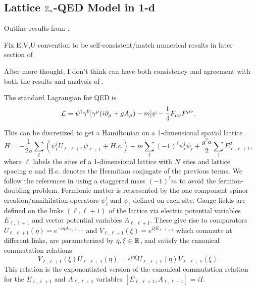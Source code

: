 \documentclass[10pt,reqno]{amsart}
\numberwithin{equation}{section}
\begin{document}
	\subsection{Lattice $\mathbb{Z}_n$-QED Model in 1-d}
	
	Outline results from \cite{Ercolessi18,Notarnicola15,Wiese13}.
	
	Fix E,V,U convention to be self-consistent/match numerical results in later section of \cite{Ercolessi18}
	
	After more thought, I don't think can have both consistency and agreement with both the results and analysis of \cite{Ercolessi18}.
	
	The standard Lagrangian for QED is 
	\begin{equation}
		\mathcal{L} = \psi^\dagger\gamma^0[\gamma^\mu(i\partial_\mu+gA_\mu)-m]\psi -\frac{1}{4}F_{\mu\nu}F^{\mu\nu}.
	\end{equation}
	
	This can be discretized to get a Hamiltonian on a 1-dimensional spatial lattice \cite{Ercolessi18,Notarnicola15,Wiese13}.
	\begin{equation}\label{eq:1dQEDLatticeHamiltonian}
		H=-\frac{1}{2a} \sum_\ell (\psi_\ell^\dagger U_{\ell,\ell+1}\psi_{\ell+1}+H.c.) + m\sum_\ell (-1)^\ell \psi_\ell^\dagger\psi_\ell+ \frac{g^2 a}{2} \sum_{\ell} E_{\ell,\ell+1}^2,		
	\end{equation}
	where $\ell$ labels the sites of a 1-dimensional lattice with $N$ sites and lattice spacing $a$ and H.c. denotes the Hermitian conjugate of the previous terms. 
	We follow the references in using a staggered mass $(-1)^\ell m$ to avoid the fermion-doubling problem.
	Fermionic matter is represented by the one component spinor creation/annihilation operators $\psi_\ell^\dagger$ and $\psi_\ell$ defined on each site.
	Gauge fields are defined on the links $(\ell,\ell+1)$ of the lattice via electric potential variables $E_{\ell,\ell+1}$ and vector potential variables $A_{\ell,\ell+1}$.
	These give rise to comparators $U_{\ell,\ell+1}(\eta)=e^{-i\eta A_{\ell,\ell+1}}$ and $V_{{\ell,\ell+1}}(\xi)=e^{i\xi E_{\ell,\ell+1}}$ which commute at different links, are parameterized by $\eta,\xi \in \mathbb{R}$, and satisfy the canonical commutation relations
	\begin{equation}\label{eq:1dQEDunitaryCCR}
		V_{\ell,\ell+1}(\xi)U_{\ell,\ell+1}(\eta)=e^{i\eta\xi}U_{\ell,\ell+1}(\eta)V_{\ell,\ell+1}(\xi).
	\end{equation}
	This relation is the exponentiated version of the canonical commutation relation for the $E_{\ell,\ell+1}$ and $A_{\ell,\ell+1}$ variables $[E_{\ell,\ell+1},A_{\ell,\ell+1}]=iI$.
	
\end{document}
